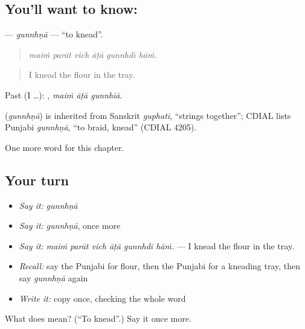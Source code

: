 \subsection*{You'll want to know: }
\textbf{} — \emph{gunnhṇā} — \textquotedblleft{}to knead\textquotedblright{}.

\begin{quote}
     
\end{quote}

\begin{quote}
\emph{maiṁ parāt vich āṭā gunnhdī hāṁ.}
\end{quote}

\begin{quote}
I knead the flour in the tray.
\end{quote}

Past (I …):   , \emph{maiṁ āṭā gunnhiā}.

\begin{cousinweb}
\textbf{} (\emph{gunnhṇā}) is inherited from Sanskrit \emph{guphati}, \textquotedblleft{}strings together\textquotedblright{}; CDIAL lists Punjabi \emph{gunnhṇā}, \textquotedblleft{}to braid, knead\textquotedblright{} (CDIAL 4205).
\end{cousinweb}

\begin{grammarlens}[title={What you've built}]
One more word for this chapter.
\end{grammarlens}

\subsection*{Your turn}
\begin{itemize}
\raggedright
  \item \emph{Say it:} \emph{gunnhṇā}
  \item \emph{Say it:} \emph{gunnhṇā}, once more
  \item \emph{Say it:} \emph{maiṁ parāt vich āṭā gunnhdī hāṁ.} — I knead the flour in the tray.
  \item \emph{Recall:} say the Punjabi for flour, then the Punjabi for a kneading tray, then say \emph{gunnhṇā} again
  \item \emph{Write it:} copy \textbf{} once, checking the whole word
\end{itemize}

\begin{tcolorbox}[breakable,colback=teal!4,colframe=teal!35!black,title={Before you move on}]
What does  mean? (\textquotedblleft{}To knead\textquotedblright{}.) Say it once more.
\end{tcolorbox}

